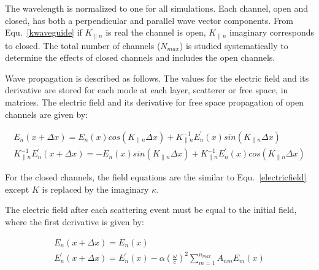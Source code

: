 The wavelength is normalized to one for all simulations.  
Each channel, open and closed, has both a perpendicular and parallel wave vector components.
From Equ.~\ref{kwaveguide} if $K_{\parallel n}$ is real the channel is open, $K_{\parallel n}$ imaginary 
corresponds to closed.  The total number of channels ($N_{max}$) is
studied systematically to determine the effects of closed channels and 
includes the open channels.

Wave propagation is described as follows.  The values for the electric 
field and its derivative are stored for each mode at each layer, scatterer 
or free space, in matrices. The electric field and its derivative for free 
space propagation of open channels are given by:

\begin{equation}
\begin{gathered}
E_n(x+\Delta x)=E_n(x)cos(K_{\parallel n}\Delta x)+K_{\parallel n}^{-1}
E_n^{'}(x)sin(K_{\parallel n}\Delta x) \\
K_{\parallel n}^{-1}E_n^{'}(x+\Delta x)=-E_n(x)sin(K_{\parallel n} \Delta x)
+K_{\parallel n}^{-1}E_n^{'}(x)cos(K_{\parallel n}\Delta x)
\end{gathered}
\label{electricfield}
\end{equation}

For the closed channels, the field equations are the similar to 
Equ.~\ref{electricfield} except $K$ is replaced by the imaginary $\kappa$.

The electric field after each scattering event must be equal to the
initial field, where the first derivative is given by:

\begin{equation}
\begin{gathered}
E_n(x+\Delta x)=E_n(x)\\
E_n^{'}(x+\Delta x)=E_n^{'}(x)-\alpha(\frac{\omega}{c})^2\sum_{m=1}^{n_{max}}
A_{nm}E_m(x) 
\end{gathered}
\end{equation}

